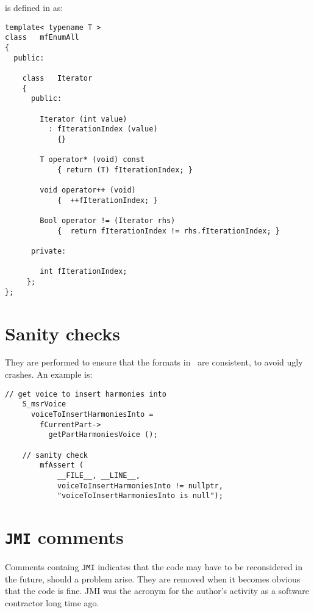 \newpage

 is defined in  as:
\begin{lstlisting}[language=CPlusPlus]
template< typename T >
class   mfEnumAll
{
  public:

    class   Iterator
    {
      public:

        Iterator (int value)
          : fIterationIndex (value)
            {}

        T operator* (void) const
            { return (T) fIterationIndex; }

        void operator++ (void)
            {  ++fIterationIndex; }

        Bool operator != (Iterator rhs)
            {  return fIterationIndex != rhs.fIterationIndex; }

      private:

        int fIterationIndex;
     };
};
\end{lstlisting}


\section{Sanity checks}

They are performed to ensure that the formats in \mf\ are consistent, to avoid ugly crashes. An example is:
\begin{lstlisting}[language=CPlusPlus]
    // get voice to insert harmonies into
    S_msrVoice
      voiceToInsertHarmoniesInto =
        fCurrentPart->
          getPartHarmoniesVoice ();

    // sanity check
		mfAssert (
			__FILE__, __LINE__,
			voiceToInsertHarmoniesInto != nullptr,
			"voiceToInsertHarmoniesInto is null");
\end{lstlisting}


\section{{\tt JMI} comments}

Comments containg {\tt JMI} indicates that the code may have to be reconsidered in the future, should a problem arise. They are removed when it becomes obvious that the code is fine. JMI was the acronym for the author's activity as a software contractor long time ago.


